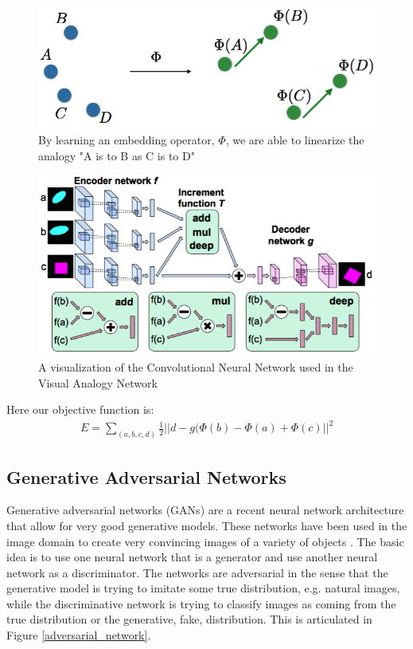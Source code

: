 \documentclass{article}
\begin{document}
\begin{figure}[h]
    \centering
    \includegraphics[scale=0.40]{embed_linear.png}
    \caption{By learning an embedding operator, $\Phi$, we are able to linearize the analogy "A is to B as C is to D"}
    \label{embed_linear}
\end{figure}

\begin{figure}[h]
    \centering
    \includegraphics[scale=0.40]{analogy_network.png}
    \caption{A visualization of the Convolutional Neural Network used in the Visual Analogy Network}
    \label{analogy_network}
\end{figure}

Here our objective function is:
\begin{eqnarray*}
E = \sum_{(a,b,c,d)} \frac{1}{2}||d - g(\Phi(b) - \Phi(a) + \Phi(c)||^2
\end{eqnarray*}

\subsection{Generative Adversarial Networks}
Generative adversarial networks (GANs) \cite{goodfellow2014generative} are a recent neural network architecture that allow for very good generative models. These networks have been used in the image domain to create very convincing images of a variety of objects \cite{denton2015deep}. The basic idea is to use one neural network that is a generator and use another neural network as a discriminator. The networks are adversarial in the sense that the generative model is trying to imitate some true distribution, e.g. natural images, while the discriminative network is trying to classify images as coming from the true distribution or the generative, fake, distribution. This is articulated in Figure \ref{adversarial_network}.
\end{document}
